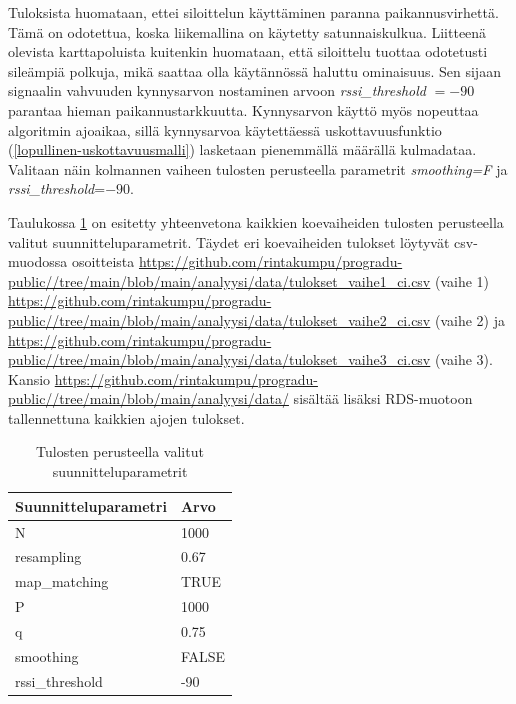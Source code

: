\documentclass[
  12pt,
  a4paper, twoside]{book}
\begin{document}
Tuloksista huomataan, ettei siloittelun käyttäminen paranna paikannusvirhettä. Tämä on odotettua, koska liikemallina on käytetty satunnaiskulkua. Liitteenä olevista karttapoluista kuitenkin huomataan, että siloittelu tuottaa odotetusti sileämpiä polkuja, mikä saattaa olla käytännössä haluttu ominaisuus. Sen sijaan signaalin vahvuuden kynnysarvon nostaminen arvoon \emph{rssi\_threshold} \(=-90\) parantaa hieman paikannustarkkuutta. Kynnysarvon käyttö myös nopeuttaa algoritmin ajoaikaa, sillä kynnysarvoa käytettäessä uskottavuusfunktio (\ref{lopullinen-uskottavuusmalli}) lasketaan pienemmällä määrällä kulmadataa. Valitaan näin kolmannen vaiheen tulosten perusteella parametrit \emph{smoothing=F} ja \emph{rssi\_threshold}=\(-90\).

Taulukossa \ref{tab:tulokset-final} on esitetty yhteenvetona kaikkien koevaiheiden tulosten perusteella valitut suunnitteluparametrit. Täydet eri koevaiheiden tulokset löytyvät csv-muodossa osoitteista \newline \url{https://github.com/rintakumpu/progradu-public//tree/main/blob/main/analyysi/data/tulokset_vaihe1_ci.csv} (vaihe 1) \newline \url{https://github.com/rintakumpu/progradu-public//tree/main/blob/main/analyysi/data/tulokset_vaihe2_ci.csv} (vaihe 2) ja \newline \url{https://github.com/rintakumpu/progradu-public//tree/main/blob/main/analyysi/data/tulokset_vaihe3_ci.csv} (vaihe 3). Kansio \url{https://github.com/rintakumpu/progradu-public//tree/main/blob/main/analyysi/data/} sisältää lisäksi RDS-muotoon tallennettuna kaikkien ajojen tulokset.

\begin{table}

\caption{\label{tab:tulokset-final}Tulosten perusteella valitut suunnitteluparametrit}
\centering
\begin{tabular}[t]{ll}
\toprule
Suunnitteluparametri & Arvo\\
\midrule
N & 1000\\
resampling & 0.67\\
map\_matching & TRUE\\
P & 1000\\
q & 0.75\\
\addlinespace
smoothing & FALSE\\
rssi\_threshold & -90\\
\bottomrule
\end{tabular}
\end{table}
\end{document}
